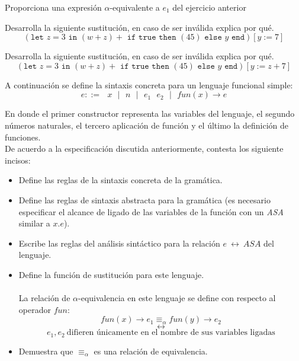 \bigskip
    
    \begin{exercise}
        Proporciona una expresión $\alpha$-equivalente a $e_1$ del ejercicio anterior 
    \end{exercise}

    \bigskip
    
    
    \begin{exercise}
         Desarrolla la siguiente sustitución, en caso de ser inválida explica por qué.
         \[
        (\texttt{let } z = 3 \texttt{ in } (w + z) + \texttt{ if} \texttt{ true} \texttt{ then } (45) \texttt{ else } y \texttt{ end}) [y:=7]
         \]
    \end{exercise}

    \bigskip
    
    \begin{exercise}
        Desarrolla la siguiente sustitución, en caso de ser inválida explica por qué. 
        \[
            (\texttt{let } z = 3 \texttt{ in } (w + z) + \texttt{ if} \texttt{ true} \texttt{ then } (45) \texttt{ else } y  \texttt{ end}) [y:=z+7]
        \]
    \end{exercise}

    \bigskip

   \begin{exercise}
        A continuación se define la sintaxis concreta para un lenguaje funcional simple:
        \[ e ::=  \text{ $x$ } \text{$|$} \text{ $n$  }\text{$|$} \text{ } e_1 \text{ } e_2 \text{ } \text{$|$} \text{ } fun(x) \rightarrow e \]

    En donde el primer constructor representa las variables del lenguaje, el segundo números naturales,
    el tercero aplicación de función y el último la definición de funciones.\\

    De acuerdo a la especificación discutida anteriormente, contesta los siguiente incisos: \\
    \begin{itemize}
        \item Define las reglas de la sintaxis concreta de la gramática.
        \item Define las reglas de sintaxis abstracta para la gramática (es necesario especificar el alcance de ligado de las variables de la función con un \textit{ASA} similar a $x.e$).
        \item Escribe las reglas del análisis sintáctico  para la relación $e \ \longleftrightarrow\ ASA$ del lenguaje.
        \item Define la función de sustitución para este lenguaje. \\\\
        La relación de $\alpha$-equivalencia en este lenguaje se define con respecto al operador $fun$:
             \[ fun(x) \rightarrow e_1 \equiv_\alpha fun(y) \rightarrow e_2   \]
	  \[  \longleftrightarrow  \]
	  \[e_1, e_2 \  \text{difieren únicamente en el nombre de sus variables ligadas}\]
             \item Demuestra que $\equiv_\alpha$ es una relación de equivalencia.
    \end{itemize}

   \end{exercise}
    